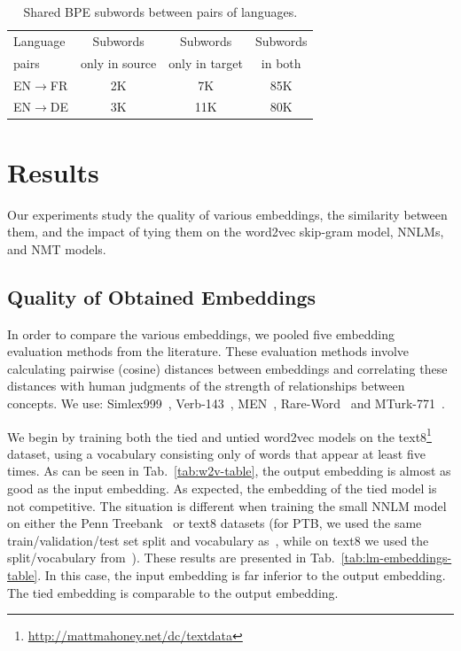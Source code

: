 \documentclass[11pt]{article}
\begin{document}
\begin{table}[t]

\begin{small}
\begin{center}
\begin{tabular}{l|ccc}
\hline
Language  & Subwords  & Subwords  & Subwords   \\ 
 pairs & only in source & only in target &in both \\\hline
EN$\rightarrow$FR & 2K & 7K & 85K   \\ 
EN$\rightarrow$DE & 3K & 11K & 80K  \\ \hline
\end{tabular}
\end{center}
\end{small}

\caption{\small Shared BPE subwords between pairs of languages.}
\label{tab:word-count}
\end{table}



\section{Results}
\label{sec:results}

Our experiments study the quality of various embeddings, the similarity between them, and the impact of tying them on the word2vec skip-gram model,  NNLMs, and NMT models.

%
%

%
%
%
%
%
%
%
%
%
%

%
%


\subsection{Quality of Obtained Embeddings}

In order to compare the various embeddings, we pooled five embedding evaluation methods from the literature. These evaluation methods involve calculating pairwise (cosine) distances between embeddings and correlating these distances with human judgments of the strength of relationships between concepts. We use: Simlex999~\cite{simlex999}, Verb-143~\cite{verb143}, MEN~\cite{bruni2014}, Rare-Word~\cite{Luong-rare} and MTurk-771~\cite{mturk771}. 

We begin by  training both  the  tied and untied word2vec models on the text8\footnote{\tiny \url{http://mattmahoney.net/dc/textdata}} dataset, using a vocabulary consisting only of words that appear at least five times. As can be seen in Tab.~\ref{tab:w2v-table}, the output embedding is almost as good as the input embedding. As expected, the embedding of the tied model is not competitive. The situation is different when training the small NNLM model on either the Penn Treebank~\cite{ptb} or text8 datasets (for PTB, we used the same train/validation/test set split and vocabulary as~\cite{MikolovKBCK11}, while on text8 we used the split/vocabulary from~\cite{mikolovJCMR14}). These results are presented in Tab.~\ref{tab:lm-embeddings-table}. In this case, the input embedding is far inferior to the output embedding. The tied embedding is comparable to the output embedding.   %
\end{document}
